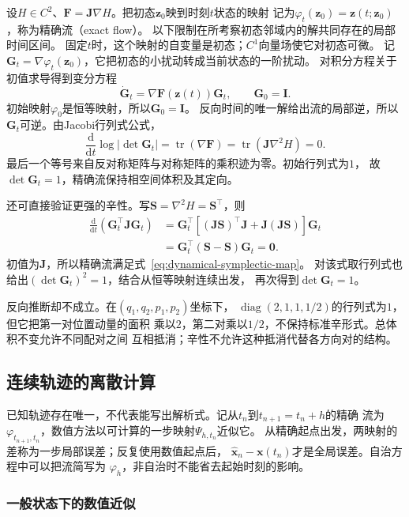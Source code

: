 设$H\in C^2$、$\bm F=\bm J\nabla H$。把初态$\bm z_0$映到时刻$t$状态的映射
记为$\varphi_t(\bm z_0)=\bm z(t;\bm z_0)$，称为精确流（exact flow）。
以下限制在所考察初态邻域内的解共同存在的局部时间区间。
固定$t$时，这个映射的自变量是初态；$C^1$向量场使它对初态可微。
记$\bm G_t=\nabla\varphi_t(\bm z_0)$，它把初态的小扰动转成当前状态的一阶扰动。
对积分方程关于初值求导得到变分方程
\[
  \dot{\bm G}_t=\nabla\bm F(\bm z(t))\bm G_t,\qquad \bm G_0=\bm I.
\]
初始映射$\varphi_0$是恒等映射，所以$\bm G_0=\bm I$。
反向时间的唯一解给出流的局部逆，所以$\bm G_t$可逆。由Jacobi行列式公式，
\[
  \frac{\mathrm d}{\mathrm dt}\log|\det\bm G_t|
  =\operatorname{tr}(\nabla\bm F)
  =\operatorname{tr}(\bm J\nabla^2H)=0.
\]
最后一个等号来自反对称矩阵与对称矩阵的乘积迹为零。初始行列式为$1$，
故$\det\bm G_t=1$，精确流保持相空间体积及其定向。

还可直接验证更强的辛性。写$\bm S=\nabla^2H=\bm S^\top$，则
\[
  \begin{aligned}
    \frac{\mathrm d}{\mathrm dt}(\bm G_t^\top\bm J\bm G_t)
    &=\bm G_t^\top[(\bm J\bm S)^\top\bm J
                         +\bm J(\bm J\bm S)]\bm G_t\\
    &=\bm G_t^\top(\bm S-\bm S)\bm G_t=\bm0.
  \end{aligned}
\]
初值为$\bm J$，所以精确流满足式~\eqref{eq:dynamical-symplectic-map}。
对该式取行列式也给出$(\det\bm G_t)^2=1$，结合从恒等映射连续出发，
再次得到$\det\bm G_t=1$。

反向推断却不成立。在$(q_1,q_2,p_1,p_2)$坐标下，
$\operatorname{diag}(2,1,1,1/2)$的行列式为$1$，但它把第一对位置动量的面积
乘以$2$，第二对乘以$1/2$，不保持标准辛形式。总体积不变允许不同配对之间
互相抵消；辛性不允许这种抵消代替各方向对的结构。

\subsection{连续轨迹的离散计算}
\label{sec:dynamical-discretization-scan}

已知轨迹存在唯一，不代表能写出解析式。记从$t_n$到$t_{n+1}=t_n+h$的精确
流为$\varphi_{t_{n+1},t_n}$，数值方法以可计算的一步映射$\Psi_{h,t_n}$近似它。
从精确起点出发，两映射的差称为一步局部误差；反复使用数值起点后，
$\widehat{\bm x}_n-\bm x(t_n)$才是全局误差。自治方程中可以把流简写为
$\varphi_h$，非自治时不能省去起始时刻的影响。

\subsubsection{一般状态下的数值近似}

